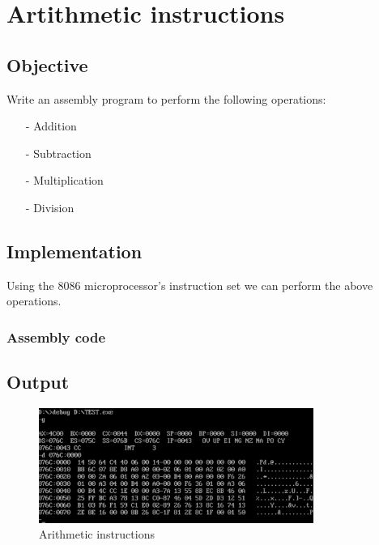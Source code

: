 \section{Artithmetic instructions}

\subsection{Objective}

Write an assembly program to perform the following operations:

\begin{itemize}
    \item[-] Addition
    \item[-] Subtraction
    \item[-] Multiplication
    \item[-] Division
\end{itemize}

\subsection{Implementation}

Using the 8086 microprocessor's instruction set we can perform the above operations.

\subsubsection{Assembly code}


\subsection{Output}

\begin{figure}[ht]
    \centering
    \includegraphics[width=0.8\textwidth]{./res/practicals/arithmetic.png}
    \caption{Arithmetic instructions}
    \label{fig:arithmetic_instructions}
\end{figure}

\pagebreak
